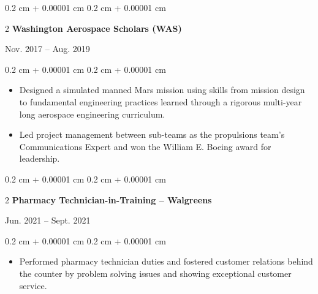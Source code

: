 \documentclass[10pt, letterpaper]{article}
\newenvironment{highlightsforbulletentries}{
    \begin{itemize}[
        topsep=0.10 cm,
        parsep=0.10 cm,
        partopsep=0pt,
        itemsep=0pt,
        leftmargin=10pt
    ]
}{
    \end{itemize}
} %
\newenvironment{onecolentry}{
    \begin{adjustwidth}{
        0.2 cm + 0.00001 cm
    }{
        0.2 cm + 0.00001 cm
    }
}{
    \end{adjustwidth}
} %
\newenvironment{twocolentry}[2][]{
    \onecolentry
    \def\secondColumn{#2}
    \setcolumnwidth{\fill, 4.5 cm}
    \begin{paracol}{2}
}{
    \switchcolumn \raggedleft \secondColumn
    \end{paracol}
    \endonecolentry
} %
\begin{document}
        \begin{twocolentry}{
            Nov. 2017 – Aug. 2019
        }{
            \textbf{Washington Aerospace Scholars (WAS)}
        }
        \end{twocolentry}
        \vspace{0.1 cm}
        \begin{onecolentry}
            \begin{highlightsforbulletentries}
                \item Designed a simulated manned Mars mission using skills from mission design to fundamental
                engineering practices learned through a rigorous multi-year long aerospace engineering curriculum.
                \item Led project management between sub-teams as the propulsions team’s Communications Expert and won
                the William E. Boeing award for leadership.
            \end{highlightsforbulletentries}
        \end{onecolentry}

        \vspace{0.2 cm}

        \begin{twocolentry}{
            Jun. 2021 – Sept. 2021
        }{
            \textbf{Pharmacy Technician-in-Training – Walgreens}
        }
        \end{twocolentry}
        \vspace{0.1 cm}
        \begin{onecolentry}
            \begin{highlightsforbulletentries}
                \item Performed pharmacy technician duties and fostered customer relations behind the counter by problem
                solving issues and showing exceptional customer service.
            \end{highlightsforbulletentries}
        \end{onecolentry}
\end{document}
